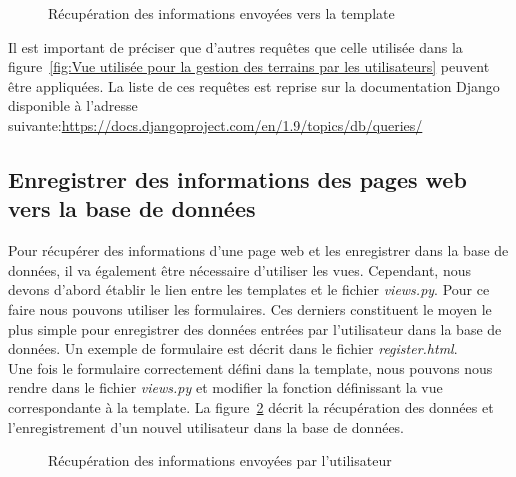 \begin{figure}[!ht]
\centering
\begin{framed}

\end{framed}
\caption{Récupération des informations envoyées vers la template}
\label{fig:Récupération des informations envoyées vers la template}
\end{figure}
\FloatBarrier

Il est important de préciser que d'autres requêtes que celle utilisée dans la figure~\ref{fig:Vue utilisée pour la gestion des terrains par les utilisateurs} peuvent être appliquées. La liste de ces requêtes est reprise sur la documentation Django disponible à l'adresse suivante:\url{https://docs.djangoproject.com/en/1.9/topics/db/queries/}

\subsection{Enregistrer des informations des pages web vers la base de données}

Pour récupérer des informations d'une page web et les enregistrer dans la base de données, il va également être nécessaire d'utiliser les vues. Cependant, nous devons d'abord établir le lien entre les templates et le fichier \textit{views.py}. Pour ce faire nous pouvons utiliser les formulaires. Ces derniers constituent le moyen le plus simple pour enregistrer des données entrées par l'utilisateur dans la base de données. Un exemple de formulaire est décrit dans le fichier \textit{register.html}.\\

Une fois le formulaire correctement défini dans la template, nous pouvons nous rendre dans le fichier \textit{views.py} et modifier la fonction définissant la vue correspondante à la template. La figure~\ref{fig:Récupération des informations envoyées par l'utilisateur} décrit la récupération des données et l'enregistrement d'un nouvel utilisateur dans la base de données. 

\begin{figure}[!ht]
\centering
\begin{framed}

\end{framed}
\caption{Récupération des informations envoyées par l'utilisateur}
\label{fig:Récupération des informations envoyées par l'utilisateur}
\end{figure}
\FloatBarrier